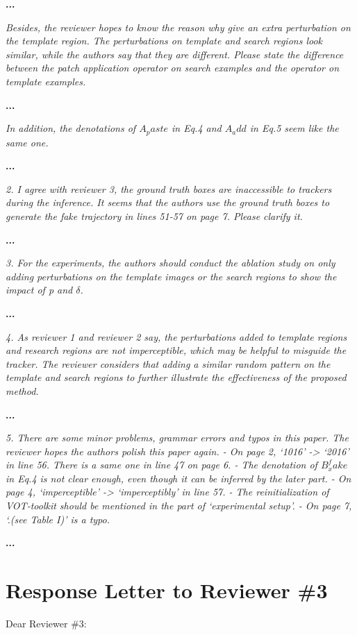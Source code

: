\documentclass[12pt]{article}
\begin{document}
\textbf{...}

\textit{Besides, the reviewer hopes to know the reason why give an extra perturbation on the template region. The perturbations on template and search regions look similar, while the authors say that they are different. Please state the difference between the patch application operator on search examples and the operator on template examples.}

\textbf{...}

\textit{In addition, the denotations of $A_paste$ in Eq.4 and $A_add$ in Eq.5 seem like the same one.}

\textbf{...}


\textit{2. I agree with reviewer 3, the ground truth boxes are inaccessible to trackers during the inference. It seems that the authors use the ground truth boxes to generate the fake trajectory in lines 51-57 on page 7. Please clarify it.}

\textbf{...}

\textit{3. For the experiments, the authors should conduct the ablation study on only adding perturbations on the template images or the search regions to show the impact of p and $\delta$.}

\textbf{...}

\textit{4. As reviewer 1 and reviewer 2 say, the perturbations added to template regions and research regions are not imperceptible, which may be helpful to misguide the tracker. The reviewer considers that adding a similar random pattern on the template and search regions to further illustrate the effectiveness of the proposed method.}

\textbf{...}

\textit{
5. There are some minor problems, grammar errors and typos in this paper. The reviewer hopes the authors polish this paper again. 
- On page 2, ‘1016’ -> ‘2016’ in line 56. There is a same one in line 47 on page 6.
- The denotation of $B_x^fake$ in Eq.4 is not clear enough, even though it can be inferred by the later part.
- On page 4, ‘imperceptible’ -> ‘imperceptibly’ in line 57.
- The reinitialization of VOT-toolkit should be mentioned in the part of ‘experimental setup’.
- On page 7, ‘.(see Table I)’ is a typo.
}

\textbf{...}

\clearpage
\newpage
{\centering\section*{Response Letter to Reviewer \#3}}
\noindent Dear Reviewer \#3:
\end{document}
